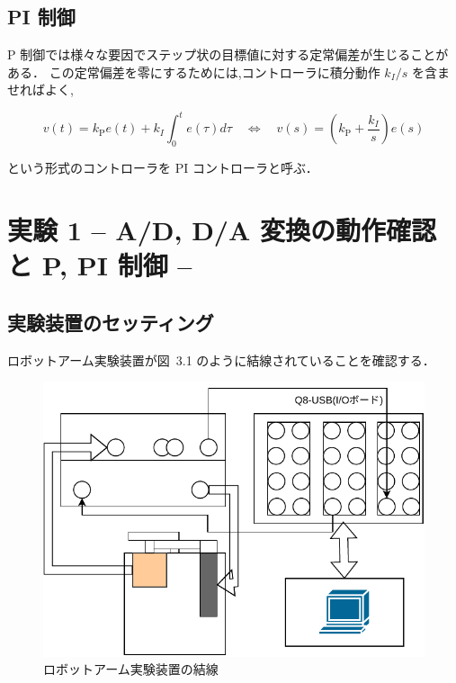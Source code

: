 \subsection{PI 制御}
P 制御では様々な要因でステップ状の目標値に対する定常偏差が生じることがある．
この定常偏差を零にするためには,コントローラに積分動作 \( k_I /s \) を含ませればよく,

\begin{equation}
  v(t) = k_{\mathrm{P}} e(t) + k_I \int_{0}^{t} e(\tau) d\tau \quad \Longleftrightarrow \quad v(s) = \left( k_{\mathrm{P}} + \frac{k_I}{s} \right)e(s)
\end{equation}

という形式のコントローラを PI コントローラと呼ぶ．


\section{実験 1 -- A/D, D/A 変換の動作確認と P, PI 制御 --}

\subsection{実験装置のセッティング}
ロボットアーム実験装置が図~3.1 のように結線されていることを確認する．


\begin{figure}[h]
  \centering
  \includegraphics[scale=0.8]{sozai/4.pdf}
  \caption{ロボットアーム実験装置の結線}
\end{figure}

